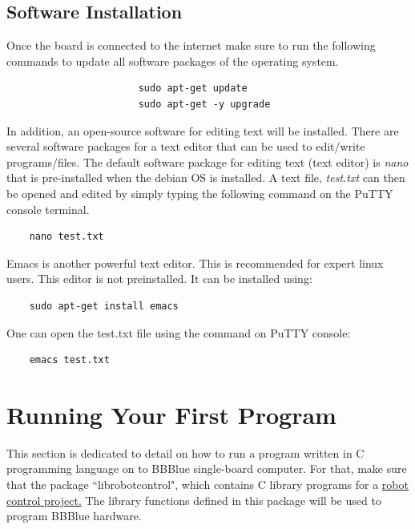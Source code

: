 %
%


\subsection{Software Installation}
\label{sec:softwareInstallation}
Once the board is connected to the internet make sure to run the following commands to update all software packages of the operating system. %
%
\begin{verbatim}
                       sudo apt-get update
                       sudo apt-get -y upgrade
\end{verbatim}
%
In addition, an open-source software for editing text will be installed. There are several software packages for a text editor that can be used to edit/write programs/files. The default software package for editing text (text editor) is \emph{nano} that is pre-installed when the debian OS is installed. A text file, \emph{test.txt} can then be opened and edited by simply typing the following command on the PuTTY console terminal. %
%
\begin{verbatim}
    nano test.txt 
\end{verbatim}
%
Emacs is another powerful text editor. This is recommended for expert linux users. This editor is not preinstalled. It can be installed using:
\begin{verbatim}
    sudo apt-get install emacs 
\end{verbatim}
%
One can open the test.txt file using the command on PuTTY console: 
\begin{verbatim}
    emacs test.txt
\end{verbatim}



\section{Running Your First Program}
\label{sec:firstprogram}

This section is dedicated to detail on how to run a program written in C programming language on to BBBlue single-board computer. For that, make sure that the package ``librobotcontrol", which contains C library programs for a \ul{robot control project.} The library functions defined in this package will be used to program BBBlue hardware. 
